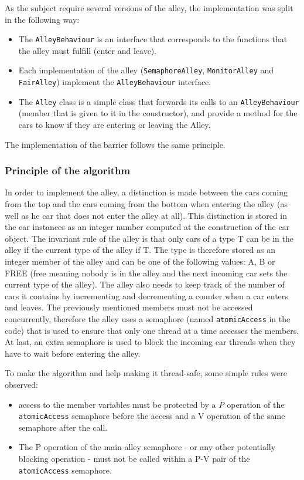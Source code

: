 As the subject require several versions of the alley, the implementation was
split in the following way:
\begin{itemize}
    \item The \texttt{AlleyBehaviour} is an interface that corresponds to the
    functions that the alley must fulfill (enter and leave).
    \item Each implementation of the alley (\texttt{SemaphoreAlley},
            \texttt{MonitorAlley} and \texttt{FairAlley}) implement the
            \texttt{AlleyBehaviour} interface.
    \item The \texttt{Alley} class is a simple class that forwards its calls to
    an \texttt{AlleyBehaviour} (member that is given to it in the constructor),
    and provide a method for the cars to know if they are entering or leaving
    the Alley.
\end{itemize}
    
The implementation of the barrier follows the same principle.

\subsubsection{Principle of the algorithm}

In order to implement the alley, a distinction is made between the cars coming
from the top and the cars coming from the bottom when entering the alley (as
well as he car that does not enter the alley at all). This distinction is stored
in the car instances as an integer number computed at the construction of the
car object. The invariant rule of the alley is that only cars of a type T can be
in the alley if the current type of the alley if T. The type is therefore stored
as an integer member of the alley and can be one of the following values: A, B
or FREE (free meaning nobody is in the alley and the next incoming car sets the
current type of the alley). The alley also needs to keep track of the number of
cars it contains by incrementing and decrementing a counter when a car enters
and leaves. The previously mentioned members must not be accessed concurrently,
therefore the alley uses a semaphore (named \texttt{atomicAccess} in the code)
that is used to ensure that only one thread at a time accesses the members. At
last, an extra semaphore is used to block the incoming car threads when they 
have to wait before entering the alley.

To make the algorithm and help making it thread-safe, some simple rules were
observed:
\begin{itemize}
    \item access to the member variables must be protected by a \textit{P}
    operation of the \texttt{atomicAccess} semaphore before the access and a
    V operation of the same semaphore after the call.
    \item The P operation of the main alley semaphore - or any other
    potentially blocking operation - must not be called within a P-V pair 
    of the \texttt{atomicAccess} semaphore.
\end{itemize}

